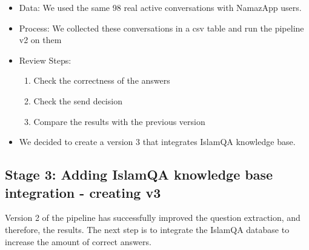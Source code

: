     \begin{itemize}
        \item Data: We used the same 98 real active conversations with NamazApp users.
        \item Process: We collected these conversations in a csv table and run the pipeline v2 on them
        \item Review Steps:
            \begin{enumerate}
                \item Check the correctness of the answers
                \item Check the send decision
                \item Compare the results with the previous version
            \end{enumerate}
        \item We decided to create a version 3 that integrates IslamQA knowledge base.
    \end{itemize}

\subsection{Stage 3: Adding IslamQA knowledge base integration - creating v3}

Version 2 of the pipeline has successfully improved the question extraction, and therefore, the results. The next step is to integrate the IslamQA database to increase the amount of correct answers.






